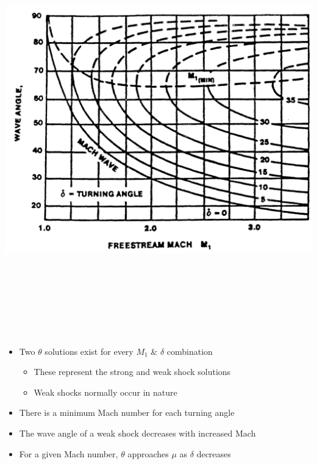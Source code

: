 \documentclass[
]{book}
\providecommand{\tightlist}{%
  \setlength{\itemsep}{0pt}\setlength{\parskip}{0pt}}
\begin{document}
\includegraphics[width=8.8in,height=7in]{media/05/image62.svg}

\begin{itemize}
\tightlist
\item
  Two \(\theta\) solutions exist for every \(M_1\) \& \(\delta\) combination

  \begin{itemize}
  \tightlist
  \item
    These represent the strong and weak shock solutions
  \item
    Weak shocks normally occur in nature
  \end{itemize}
\item
  There is a minimum Mach number for each turning angle
\item
  The wave angle of a weak shock decreases with increased Mach
\item
  For a given Mach number, \(\theta\) approaches \(\mu\) as \(\delta\) decreases
\end{itemize}
\end{document}
